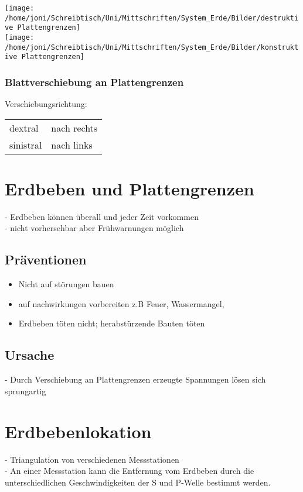 \documentclass[a4,12pt]{scrreprt}
\begin{document}
\texttt{[image: /home/joni/Schreibtisch/Uni/Mittschriften/System\_Erde/Bilder/destruktive Plattengrenzen]}\\
\texttt{[image: /home/joni/Schreibtisch/Uni/Mittschriften/System\_Erde/Bilder/konstruktive Plattengrenzen]}\\


\subsubsection{Blattverschiebung an Plattengrenzen}
Verschiebungsrichtung:
\begin{tabular}{ll}
dextral & nach rechts\\
sinistral & nach links\\
\end{tabular}

\section{Erdbeben und Plattengrenzen}

- Erdbeben können überall und jeder Zeit vorkommen\\
- nicht vorhersehbar aber Frühwarnungen möglich

\subsection{Präventionen}
\begin{itemize}
\item Nicht auf störungen bauen
\item auf nachwirkungen vorbereiten z.B Feuer, Wassermangel, 
\item Erdbeben töten nicht; herabstürzende Bauten töten
\end{itemize}

\subsection{Ursache}
- Durch Verschiebung an Plattengrenzen erzeugte Spannungen lösen sich sprungartig\\

\section{Erdbebenlokation}
- Triangulation von verschiedenen Messstationen\\
- An einer Messstation kann die Entfernung vom Erdbeben durch die unterschiedlichen Geschwindigkeiten der S und P-Welle bestimmt werden. 
\end{document}
